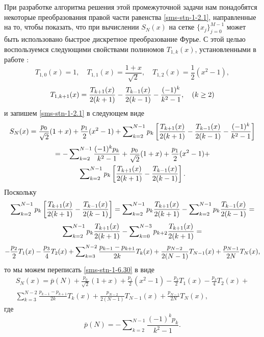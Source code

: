 При разработке алгоритма решения этой промежуточной задачи нам понадобятся некоторые преобразования правой части равенства \eqref{sms-stn-1-2.1},
направленные на то, чтобы показать, что при вычислении $S_N(x)$ на сетке %
$\{x_j\}_{j=0}^{M-1}$ может быть использовано
быстрое дискретное преобразование Фурье. С этой целью воспользуемся следующими свойствами полиномов $T_{1,k}(x)$, установленными в работе \cite{sms-stn-1-SharIzVuz}:
\begin{equation}\label{sms-stn-1-sobcheb5}
T_{1,0}(x)=1, \quad T_{1,1}(x)=\frac{1+x}{\sqrt{2}}, \quad T_{1,2}(x)=\frac12(x^2-1),
\end{equation}
\begin{equation}\label{sms-stn-1-sobcheb6}
T_{1,k+1}(x)={T_{k+1}(x)\over2(k+1)}- {T_{k-1}(x)\over2(k-1)} -\frac{(-1)^k}{k^2-1},\quad (k\ge 2)
\end{equation}
и запишем  \eqref{sms-stn-1-2.1} в следующем виде
$$
S_N(x)=\frac{p_0}{\sqrt{2}}(1+x)+\frac{p_1}2(x^2-1)+ \sum\nolimits_{k=2}^{N-1}p_k\left[{T_{k+1}(x)\over2(k+1)}- {T_{k-1}(x)\over2(k-1)} -\frac{(-1)^k}{k^2-1}\right]
$$
\begin{multline}\label{sms-stn-1-6.30}
=-\sum\nolimits_{k=2}^{N-1} \frac{(-1)^kp_k}{k^2-1}+\frac{p_0}{\sqrt{2}}(1+x)+\frac{p_1}2(x^2-1)+
\\
\sum\nolimits_{k=2}^{N-1}p_k\left[{T_{k+1}(x)\over2(k+1)}- {T_{k-1}(x)\over2(k-1)}\right].
\end{multline}
Поскольку
$$
\sum\nolimits_{k=2}^{N-1}p_k\left[{T_{k+1}(x)\over2(k+1)}- {T_{k-1}(x)\over2(k-1)} \right]=
\sum\nolimits_{k=2}^{N-1}p_k{T_{k+1}(x)\over2(k+1)}-\sum\nolimits_{k=2}^{N-1}p_k{T_{k-1}(x)\over2(k-1)}=
$$
$$
\sum\nolimits_{k=2}^{N-1}p_k{T_{k+1}(x)\over2(k+1)}-\sum\nolimits_{k=0}^{N-3}p_{k+2}{T_{k+1}(x)\over2(k+1)}=
$$
$$
-{p_{2}\over2}T_{1}(x)-{p_{3}\over4}T_{2}(x)+\sum\nolimits_{k=3}^{N-2}{p_{k-1}-p_{k+1}\over2k}T_k(x)
+{p_{N-2}\over2(N-1)}T_{N-1}(x)+{p_{N-1}\over2N}T_{N}(x),
$$
то   мы можем переписать \eqref{sms-stn-1-6.30} в виде
\begin{multline}\label{sms-stn-1-6.31}
S_N(x)=
\bar p(N)+\frac{p_0}{\sqrt{2}}(1+x)+\frac{p_1}2(x^2-1)-\frac{p_{2}}{2}T_{1}(x)-\frac{p_{3}}{4}T_{2}(x)+
\\
\sum\nolimits_{k=3}^{N-2}\frac{p_{k-1}-p_{k+1}}{2k}T_k(x)
+\frac{p_{N-2}}{2(N-1)}T_{N-1}(x)+\frac{p_{N-1}}{2N}T_{N}(x),
\end{multline}
где
\begin{equation}\label{sms-stn-1-6.32}
\bar p(N)= -\sum\nolimits_{k=2}^{N-1} \frac{(-1)^kp_k}{k^2-1}.
\end{equation}
